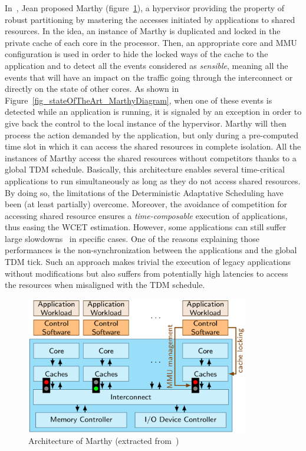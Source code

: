 \documentclass[main.tex]{subfiles}
\begin{document}
In~\cite{jean12}, Jean \etal proposed {\sc Marthy} (figure~\ref{fig_stateOfTheArt_Marthy}), a hypervisor providing the property of robust partitioning by mastering the accesses initiated by applications to shared resources. In the idea, an instance of {\sc Marthy} is duplicated and locked in the private cache of each core in the processor. Then, an appropriate core and MMU configuration is used in order to hide the locked ways of the cache to the application and to detect all the events considered as \emph{sensible}, meaning all the events that will have an impact on the traffic going through the interconnect or directly on the state of other cores. As shown in Figure~\ref{fig_stateOfTheArt_MarthyDiagram}, when one of these events is detected while an application is running, it is signaled by an exception in order to give back the control to the local instance of the hypervisor. {\sc Marthy} will then process the action demanded by the application, but only during a pre-computed time slot in which it can access the shared resources in complete isolation. All the instances of {\sc Marthy} access the shared resources without competitors thanks to a global TDM schedule. 
Basically, this architecture enables several time-critical applications to run simultaneously as long as they do not access shared resources. By doing so, the limitations of the Deterministic Adaptative Scheduling have been (at least partially) overcome. Moreover, the avoidance of competition for accessing shared resource ensures a \emph{time-composable} execution of applications, thus easing the WCET estimation. However, some applications can still suffer large slowdowns~\cite{Jean2015} in specific cases. One of the reasons explaining those performances is the non-synchronization between the applications and the global TDM tick. Such an approach makes trivial the execution of legacy applications without modifications but also suffers from potentially high latencies to access the resources when misaligned with the TDM schedule. \\ 


\begin{figure}
    \centering
    \includegraphics[height=6cm]{imgs/png/stateOfTheArt_Marthy.png}
    \caption{Architecture of {\sc Marthy} (extracted from~\cite{jean12})}
    \label{fig_stateOfTheArt_Marthy}
\end{figure}
\end{document}

